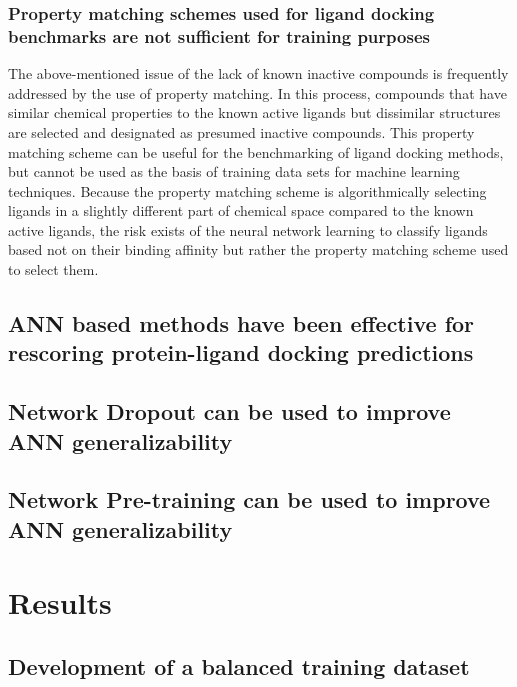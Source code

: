 \subsubsection{Property matching schemes used for ligand docking benchmarks are not sufficient for training purposes}
The above-mentioned issue of the lack of known inactive compounds is frequently addressed by the use of property matching.
In this process, compounds that have similar chemical properties to the known active ligands but dissimilar structures are selected and designated as presumed inactive compounds\citep{Huang:2006gi, Mysinger:2012hu, Bauer:2013de}.
This property matching scheme can be useful for the benchmarking of ligand docking methods, but cannot be used as the basis of training data sets for machine learning techniques.
Because the property matching scheme is algorithmically selecting ligands in a slightly different part of chemical space compared to the known active ligands, the risk exists of the neural network learning to classify ligands based not on their binding affinity but rather the property matching scheme used to select them.

\subsection{ANN based methods have been effective for rescoring protein-ligand docking predictions}

\subsection{Network Dropout can be used to improve ANN generalizability}

\subsection{Network Pre-training can be used to improve ANN generalizability}

\section{Results}

\subsection{Development of a balanced training dataset}


